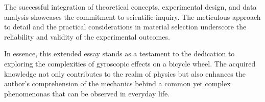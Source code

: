 \documentclass{article}
\begin{document}
The successful integration of theoretical concepts, experimental design, and data analysis showcases the commitment to scientific inquiry. The meticulous approach to detail and the practical considerations in material selection underscore the reliability and validity of the experimental outcomes.

In essence, this extended essay stands as a testament to the dedication to exploring the complexities of gyroscopic effects on a bicycle wheel. The acquired knowledge not only contributes to the realm of physics but also enhances the author's comprehension of the mechanics behind a common yet complex phenomenonas that can be observed in everyday life.

\pagebreak

\end{document}
